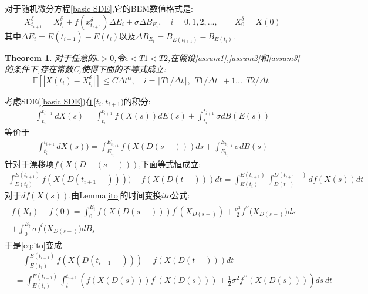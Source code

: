 \documentclass[12pt,final]{article}
\makeatletter
\numberwithin{equation}{section}
\numberwithin{figure}{section}
\numberwithin{table}{section}
\theoremstyle{plain}
\renewcommand{\proofname}{proof}
\newtheorem{theorem}{Theorem}[section]   %
\theoremstyle{definition}
\theoremstyle{remark}
\renewenvironment{proof}[1][\proofname]{\par
	\pushQED{\qed}%
	\normalfont \topsep6\p@\@plus6\p@\relax
	\trivlist\item[\hskip\labelsep
	\bfseries #1\@addpunct{\,:\,}]\ignorespaces
}{%
	\popQED\endtrivlist\@endpefalse
}
\makeatother
\begin{document}
	对于随机微分方程\eqref{basic SDE},它的BEM数值格式是:
	\begin{equation}\label{eq:1}
		X_{t_{i+1}}^{\delta}=X_{t_i}^{\delta}+f(x_{t_{i+1}}^{\delta})\Delta E_{i}+\sigma\Delta B_{E_{i}},\quad i=0,1,2,\ldots,\qquad X_0^\delta=X(0)
	\end{equation}
	其中$\Delta E_{i}=E(t_{i+1})-E(t_i)$以及$\Delta B_{E_{i}}=B_{E{(t_{i+1})}}-B_{E({t_i})}$.
	\begin{theorem}\label{main th}
		对于任意的$\epsilon>0$,令$\epsilon < T1 < T2$,在假设\ref{assum1},\ref{assum2}和\ref{assum3}的条件下,存在常数C,使得下面的不等式成立:
		$$\mathbb{E}[|X({t_i})-X_{t_i}^{\delta}|]\le C\Delta t^\alpha,\quad i=\lceil T1/\Delta t \rceil,\lceil T1/\Delta t \rceil+1 \ldots \lceil T2/\Delta t \rceil$$
	\end{theorem}
	\begin{proof}
		考虑SDE(\ref{basic SDE})在$[t_i,t_{i+1})$的积分:
		\begin{align}
			\int_{t_i}^{t_{i+1}}dX(s)=\int_{t_i}^{t_{i+1}}f(X(s))dE(s)+\int_{t_i}^{t_{i+1}}\sigma dB(E(s))
		\end{align}
		等价于
		\begin{align}
			\int_{t_i}^{t_{i+1}}dX(s))=\int_{E_{t_i}}^{E_{t_{i+1}}}f(X(D(s-)))ds+\int_{E_{t_i}}^{E_{t_{i+1}}}\sigma dB(s)
		\end{align}
		针对于漂移项$f(X(D-(s-)))$,下面等式恒成立:
		\begin{align}\label{eq:ito}
			\int_{E(t_i)}^{E(t_{i+1})} f(X(D(t_{i+1}-)))) - f(X(D(t-))) dt = \int_{E(t_i)}^{E(t_{i+1})} \int^{D(t_{i+1}-)}_{D(t_-)} df(X(s)) dt
		\end{align}
		对于$df(X(s))$,由Lemma\ref{ito}的时间变换$ito$公式:
		\begin{align*}
			\begin{gathered}
				f(X_{t})-f(0)=\int_{0}^{E_{t}}f(X(D(s-)))f^{\prime}\left(X_{D(s-)}\right)+\frac{\sigma^{2}}{2}f^{\prime\prime}\big(X_{D(s-)}\big)ds \\
				+\int_{0}^{E_{t}}\sigma f^{\prime}\big(X_{D(s-)}\big)dB_{s}
			\end{gathered}
		\end{align*}
		于是\eqref{eq:ito}变成
		\begin{equation}\label{eq:ito1}
			\begin{aligned}
				&\quad\int_{E(t_i)}^{E(t_{i+1})} f(X(D(t_{i+1}-))) - f(X(D(t-))) dt \\
				&= \int_{E(t_i)}^{E(t_{i+1})} \int_{t}^{t_{i+1}} \left( f(X(D(s))) f^{\prime}(X(D(s))) + \frac{1}{2} \sigma^2 f^{\prime\prime}(X(D(s))) \right) ds \, dt\\

\end{aligned}
\end{equation}
\end{proof}
\end{document}
